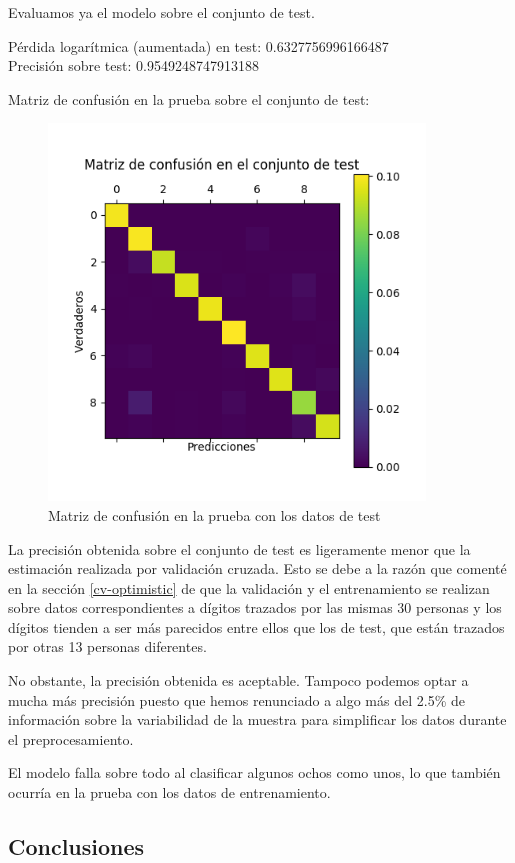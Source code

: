 \documentclass[a4]{article}
\begin{document}
Evaluamos ya el modelo sobre el conjunto de test.

Pérdida logarítmica (aumentada) en test: 0.6327756996166487 \\
Precisión sobre test: 0.9549248747913188

Matriz de confusión en la prueba sobre el conjunto de test:
\vspace{-4mm}
\begin{figure}[H]
  \centering
  \includegraphics[width=100mm]{imgs/conf-test.png}
  \caption{Matriz de confusión en la prueba con los datos de test}
  \label{fig:conf-test}
\end{figure}
\vspace{-4mm}

La precisión obtenida sobre el conjunto de test es ligeramente menor
que la estimación realizada por validación cruzada. Esto se debe a la
razón que comenté en la sección \ref{cv-optimistic} de que la
validación y el entrenamiento se realizan sobre datos correspondientes
a dígitos trazados por las mismas 30 personas y los dígitos tienden a
ser más parecidos entre ellos que los de test, que están trazados por
otras 13 personas diferentes.

No obstante, la precisión obtenida es aceptable. Tampoco podemos
optar a mucha más precisión puesto que hemos renunciado a algo más del
2.5\% de información sobre la variabilidad de la muestra para
simplificar los datos durante el preprocesamiento.

El modelo falla sobre todo al clasificar algunos ochos como unos, lo
que también ocurría en la prueba con los datos de entrenamiento.

\subsection{Conclusiones}
\end{document}
